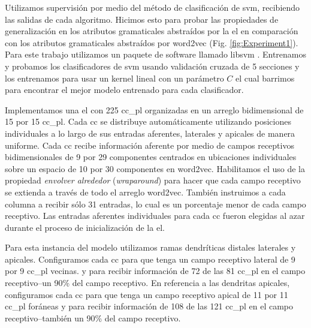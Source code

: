 {Utilizamos supervisión por medio del método de clasificación de \gls{svm}, recibiendo las salidas de cada algoritmo.
Hicimos esto para probar las propiedades de generalización en los atributos gramaticales abstraídos por la \gls{el} en comparación con los atributos gramaticales abstraídos por word2vec (Fig. \ref{fig:Experiment1}).
Para este trabajo utilizamos un paquete de software llamado \gls{libsvm} \cite{CC01a, libsvm}.
Entrenamos y probamos los clasificadores de \gls{svm} usando validación cruzada de 5 secciones y los entrenamos para usar un kernel lineal con un parámetro $C$ el cual barrimos para encontrar el mejor modelo entrenado para cada clasificador.

Implementamos una \gls{el} con 225 \gls{cc_pl} organizadas en un arreglo bidimensional de 15 por 15 \gls{cc_pl}.
Cada \gls{cc} se distribuye automáticamente utilizando posiciones individuales a lo largo de sus entradas aferentes, laterales y apicales de manera uniforme.
Cada \gls{cc} recibe información aferente por medio de campos receptivos bidimensionales de 9 por 29 componentes centrados en ubicaciones individuales sobre un espacio de 10 por 30 componentes en word2vec.
Habilitamos el uso de la propiedad \emph{envolver alrededor} (\emph{wraparound}) para hacer que cada campo receptivo se extienda a través de todo el arreglo word2vec.
También instruimos a cada columna a recibir sólo 31 entradas, lo cual es un porcentaje menor de cada campo receptivo.
Las entradas aferentes individuales para cada \gls{cc} fueron elegidas al azar durante el proceso de inicialización de la \gls{el}.

Para esta instancia del modelo utilizamos ramas dendríticas distales laterales y apicales.
Configuramos cada \gls{cc} para que tenga un campo receptivo lateral de 9 por 9 \gls{cc_pl} vecinas.
y para recibir información de 72 de las 81 \gls{cc_pl} en el campo receptivo--un 90\% del campo receptivo.
En referencia a las dendritas apicales, configuramos cada \gls{cc} para que tenga un campo receptivo apical de 11 por 11 \gls{cc_pl} foráneas y para recibir información de 108 de las 121 \gls{cc_pl} en el campo receptivo--también un 90\% del campo receptivo.

}
